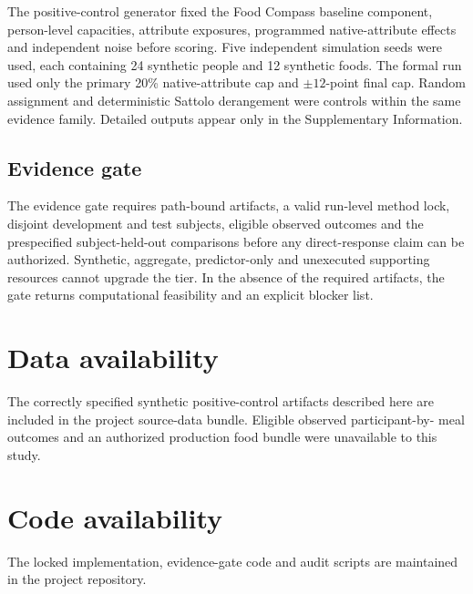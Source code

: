 The positive-control generator fixed the Food Compass baseline component,
person-level capacities, attribute exposures, programmed native-attribute
effects and independent noise before scoring. Five independent simulation seeds
were used, each containing 24 synthetic people and 12 synthetic foods. The
formal run used only the primary 20\% native-attribute cap and \(\pm 12\)-point
final cap. Random assignment and deterministic Sattolo derangement were controls
within the same evidence family. Detailed outputs appear only in the Supplementary Information.

\subsection*{Evidence gate}

The evidence gate requires path-bound artifacts, a valid run-level method lock,
disjoint development and test subjects, eligible observed outcomes and the
prespecified subject-held-out comparisons before any direct-response claim can
be authorized. Synthetic, aggregate, predictor-only and unexecuted supporting
resources cannot upgrade the tier. In the absence of the required artifacts,
the gate returns computational feasibility and an explicit blocker list.

\section*{Data availability}

The correctly specified synthetic positive-control artifacts described here are
included in the project source-data bundle. Eligible observed participant-by-
meal outcomes and an authorized production food bundle were unavailable to this
study.

\section*{Code availability}

The locked implementation, evidence-gate code and audit scripts are maintained
in the project repository.
